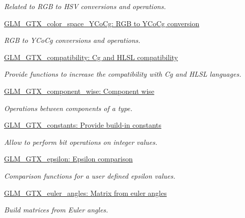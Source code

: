 \begin{DoxyCompactItemize}
\begin{DoxyCompactList}\small\item\em \-Related to \-R\-G\-B to \-H\-S\-V conversions and operations. \end{DoxyCompactList}\item 
\hyperlink{group__gtx__color__space__YCoCg}{\-G\-L\-M\-\_\-\-G\-T\-X\-\_\-color\-\_\-space\-\_\-\-Y\-Co\-Cg\-: R\-G\-B to Y\-Co\-Cg conversion}
\begin{DoxyCompactList}\small\item\em \-R\-G\-B to \-Y\-Co\-Cg conversions and operations. \end{DoxyCompactList}\item 
\hyperlink{group__gtx__compatibility}{\-G\-L\-M\-\_\-\-G\-T\-X\-\_\-compatibility\-: Cg and H\-L\-S\-L compatibility}
\begin{DoxyCompactList}\small\item\em \-Provide functions to increase the compatibility with \-Cg and \-H\-L\-S\-L languages. \end{DoxyCompactList}\item 
\hyperlink{group__gtx__component__wise}{\-G\-L\-M\-\_\-\-G\-T\-X\-\_\-component\-\_\-wise\-: Component wise}
\begin{DoxyCompactList}\small\item\em \-Operations between components of a type. \end{DoxyCompactList}\item 
\hyperlink{group__gtx__constants}{\-G\-L\-M\-\_\-\-G\-T\-X\-\_\-constants\-: Provide build-\/in constants}
\begin{DoxyCompactList}\small\item\em \-Allow to perform bit operations on integer values. \end{DoxyCompactList}\item 
\hyperlink{group__gtx__epsilon}{\-G\-L\-M\-\_\-\-G\-T\-X\-\_\-epsilon\-: Epsilon comparison}
\begin{DoxyCompactList}\small\item\em \-Comparison functions for a user defined epsilon values. \end{DoxyCompactList}\item 
\hyperlink{group__gtx__euler__angles}{\-G\-L\-M\-\_\-\-G\-T\-X\-\_\-euler\-\_\-angles\-: Matrix from euler angles}
\begin{DoxyCompactList}\small\item\em \-Build matrices from \-Euler angles. \end{DoxyCompactList}\item 

\end{DoxyCompactItemize}
